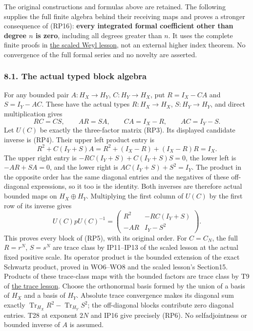 \documentclass[
  11pt,
]{article}
\begin{document}
The original constructions and formulas above are retained. The
following supplies the full finite algebra behind their receiving maps
and proves a stronger consequence of (RP16): \textbf{every integrated
formal coefficient other than degree \(n\) is zero}, including all
degrees greater than \(n\). It uses the complete finite proofs in
\href{scaled-weyl-index-degree.pdf}{the scaled Weyl lesson}, not an
external higher index theorem. No convergence of the full formal series
and no novelty are asserted.

\subsubsection{8.1. The actual typed block
algebra}\label{the-actual-typed-block-algebra}

For any bounded pair \(A:H_X\to H_Y\), \(C:H_Y\to H_X\), put
\(R=I_X-CA\) and \(S=I_Y-AC\). These have the actual types
\(R:H_X\to H_X\), \(S:H_Y\to H_Y\), and direct multiplication gives \[
 RC=CS,\qquad AR=SA,\qquad CA=I_X-R,\qquad AC=I_Y-S.
 \tag{FB1}
\] Let \(U(C)\) be exactly the three-factor matrix (RP3). Its displayed
candidate inverse is (RP4). Their upper left product entry is \[
 R^2+C(I_Y+S)A
 =R^2+(I_X-R)+(I_X-R)R=I_X.
 \tag{FB2}
\] The upper right entry is \(-RC(I_Y+S)+C(I_Y+S)S=0\), the lower left
is \(-AR+SA=0\), and the lower right is \(AC(I_Y+S)+S^2=I_Y\). The
product in the opposite order has the same diagonal entries and the
negatives of these off-diagonal expressions, so it too is the identity.
Both inverses are therefore actual bounded maps on \(H_X\oplus H_Y\).
Multiplying the first column of \(U(C)\) by the first row of its inverse
gives \[
 U(C)pU(C)^{-1}
 =\begin{pmatrix}
 R^2&-RC(I_Y+S)\\
 -AR&I_Y-S^2
 \end{pmatrix}.
 \tag{FB3}
\] This proves every block of (RP5), with its original order. For
\(C=C_N\), the full \(R=r^N\), \(S=s^N\) are trace class by IP11--IP13
of the scaled lesson at the actual fixed positive scale. Its operator
product is the bounded extension of the exact Schwartz product, proved
in WO6--WO8 and the scaled lesson's Section15. Products of these
trace-class maps with the bounded factors are trace class by T9 of
\href{traces-and-complexes.pdf}{the trace lesson}. Choose the orthonormal
basis formed by the union of a basis of \(H_X\) and a basis of \(H_Y\).
Absolute trace convergence makes its diagonal sum exactly
\(\operatorname{Tr}_{H_X}R^2-\operatorname{Tr}_{H_Y}S^2\); the
off-diagonal blocks contribute zero diagonal entries. T28 at exponent
\(2N\) and IP16 give precisely (RP6). No selfadjointness or bounded
inverse of \(A\) is assumed.
\end{document}
